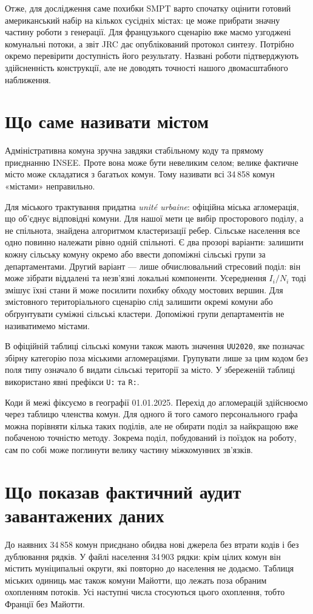 \documentclass[11pt,a4paper]{article}
\begin{document}
Отже, для дослідження саме похибки SMPT варто спочатку оцінити готовий американський набір на кількох сусідніх містах: це може прибрати значну частину роботи з генерації. Для французького сценарію вже маємо узгоджені комунальні потоки, а звіт JRC дає опублікований протокол синтезу. Потрібно окремо перевірити доступність його результату. Названі роботи підтверджують здійсненність конструкції, але не доводять точності нашого двомасштабного наближення.

\section{Що саме називати містом}
Адміністративна комуна зручна завдяки стабільному коду та прямому приєднанню INSEE. Проте вона може бути невеликим селом; велике фактичне місто може складатися з багатьох комун. Тому називати всі 34\,858 комун «містами» неправильно.

Для міського трактування придатна \emph{unité urbaine}: офіційна міська агломерація, що об'єднує відповідні комуни. Для нашої мети це вибір просторового поділу, а не спільнота, знайдена алгоритмом кластеризації ребер. Сільське населення все одно повинно належати рівно одній спільноті. Є два прозорі варіанти: залишити кожну сільську комуну окремо або ввести допоміжні сільські групи за департаментами. Другий варіант --- лише обчислювальний стресовий поділ: він може зібрати віддалені та незв'язні локальні компоненти. Усереднення $I_i/N_i$ тоді змішує їхні стани й може посилити похибку обходу мостових вершин. Для змістовного територіального сценарію слід залишити окремі комуни або обґрунтувати суміжні сільські кластери. Допоміжні групи департаментів не називатимемо містами.

В офіційній таблиці сільські комуни також мають значення \texttt{UU2020}, яке позначає збірну категорію поза міськими агломераціями. Групувати лише за цим кодом без поля типу означало б видати сільські території за місто. У збереженій таблиці використано явні префікси \texttt{U:} та \texttt{R:}.

Коди й межі фіксуємо в географії 01.01.2025. Перехід до агломерацій здійснюємо через таблицю членства комун. Для одного й того самого персонального графа можна порівняти кілька таких поділів, але не обирати поділ за найкращою вже побаченою точністю методу. Зокрема поділ, побудований із поїздок на роботу, сам по собі може поглинути велику частину міжкомунних зв'язків.

\section{Що показав фактичний аудит завантажених даних}
До наявних 34\,858 комун приєднано обидва нові джерела без втрати кодів і без дублювання рядків. У файлі населення 34\,903 рядки: крім цілих комун він містить муніципальні округи, які повторно до населення не додаємо. Таблиця міських одиниць має також комуни Майотти, що лежать поза обраним охопленням потоків. Усі наступні числа стосуються цього охоплення, тобто Франції без Майотти.
\end{document}
